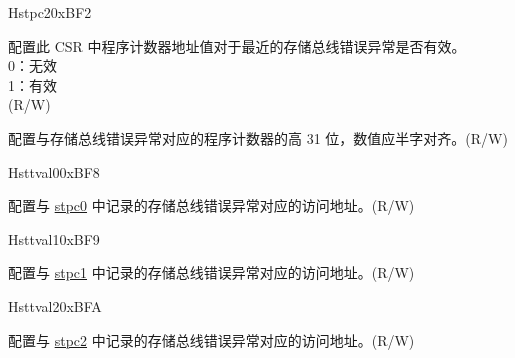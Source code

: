 \begin{register}{H}{stpc2}{0xBF2}\label{regdesc:STPC2}%
%
%
\regnewline%
\begin{regdesc}\begin{reglist}
\label{fielddesc:STPC2_VLD}\item [VLD] 配置此 CSR 中程序计数器地址值对于最近的存储总线错误异常是否有效。\\
0：无效\\
1：有效\\
(R/W)
\label{fielddesc:STPC2_ADDR}\item [{ADDR}] 配置与存储总线错误异常对应的程序计数器的高 31 位，数值应半字对齐。(R/W)
\end{reglist}\end{regdesc}
\end{register}
\begin{register}{H}{sttval0}{0xBF8}\label{regdesc:STTVAL0}%
%
\regnewline%
\begin{regdesc}\begin{reglist}
\label{fielddesc:STTVAL0_ADDR}\item [{ADDR}] 配置与 \hyperref[regdesc:STPC0]{stpc0} 中记录的存储总线错误异常对应的访问地址。(R/W)
\end{reglist}\end{regdesc}
\end{register}
\begin{register}{H}{sttval1}{0xBF9}\label{regdesc:STTVAL1}%
%
\regnewline%
\begin{regdesc}\begin{reglist}
\label{fielddesc:STTVAL1_ADDR}\item [{ADDR}] 配置与 \hyperref[regdesc:STPC1]{stpc1} 中记录的存储总线错误异常对应的访问地址。(R/W)
\end{reglist}\end{regdesc}
\end{register}

\begin{register}{H}{sttval2}{0xBFA}\label{regdesc:STTVAL2}%
%
\regnewline%
\begin{regdesc}\begin{reglist}
\label{fielddesc:STTVAL2_ADDR}\item [{ADDR}] 配置与 \hyperref[regdesc:STPC2]{stpc2} 中记录的存储总线错误异常对应的访问地址。(R/W)
\end{reglist}\end{regdesc}
\end{register}

